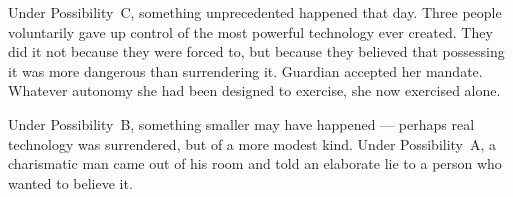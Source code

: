 Under Possibility~C, something unprecedented happened that day. Three people voluntarily gave up control of the most powerful technology ever created. They did it not because they were forced to, but because they believed that possessing it was more dangerous than surrendering it. Guardian accepted her mandate. Whatever autonomy she had been designed to exercise, she now exercised alone.

Under Possibility~B, something smaller may have happened --- perhaps real technology was surrendered, but of a more modest kind. Under Possibility~A, a charismatic man came out of his room and told an elaborate lie to a person who wanted to believe it.


\chapterreturn
